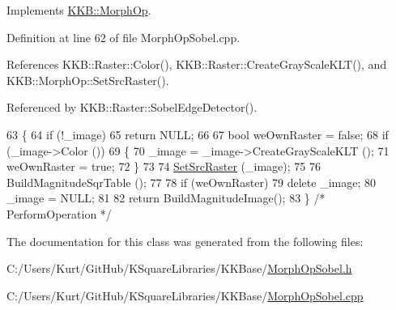 Implements \hyperlink{class_k_k_b_1_1_morph_op_ae7655bec44b6665fd042216e5cb55843}{K\+K\+B\+::\+Morph\+Op}.



Definition at line 62 of file Morph\+Op\+Sobel.\+cpp.



References K\+K\+B\+::\+Raster\+::\+Color(), K\+K\+B\+::\+Raster\+::\+Create\+Gray\+Scale\+K\+L\+T(), and K\+K\+B\+::\+Morph\+Op\+::\+Set\+Src\+Raster().



Referenced by K\+K\+B\+::\+Raster\+::\+Sobel\+Edge\+Detector().


\begin{DoxyCode}
63 \{
64   \textcolor{keywordflow}{if}  (!\_image)
65     \textcolor{keywordflow}{return} NULL;
66 
67   \textcolor{keywordtype}{bool}  weOwnRaster = \textcolor{keyword}{false};
68   \textcolor{keywordflow}{if}  (\_image->Color ())
69   \{
70     \_image = \_image->CreateGrayScaleKLT ();
71     weOwnRaster = \textcolor{keyword}{true};
72   \}
73 
74   \hyperlink{class_k_k_b_1_1_morph_op_a07c75e151d9b95ca13da3bfc2e48dba4}{SetSrcRaster} (\_image);
75 
76   BuildMagnitudeSqrTable ();
77 
78   \textcolor{keywordflow}{if}  (weOwnRaster)
79     \textcolor{keyword}{delete}  \_image;
80   \_image = NULL;
81 
82   \textcolor{keywordflow}{return}  BuildMagnitudeImage();
83 \}  \textcolor{comment}{/* PerformOperation */}
\end{DoxyCode}


The documentation for this class was generated from the following files\+:\begin{DoxyCompactItemize}
\item 
C\+:/\+Users/\+Kurt/\+Git\+Hub/\+K\+Square\+Libraries/\+K\+K\+Base/\hyperlink{_morph_op_sobel_8h}{Morph\+Op\+Sobel.\+h}\item 
C\+:/\+Users/\+Kurt/\+Git\+Hub/\+K\+Square\+Libraries/\+K\+K\+Base/\hyperlink{_morph_op_sobel_8cpp}{Morph\+Op\+Sobel.\+cpp}\end{DoxyCompactItemize}
